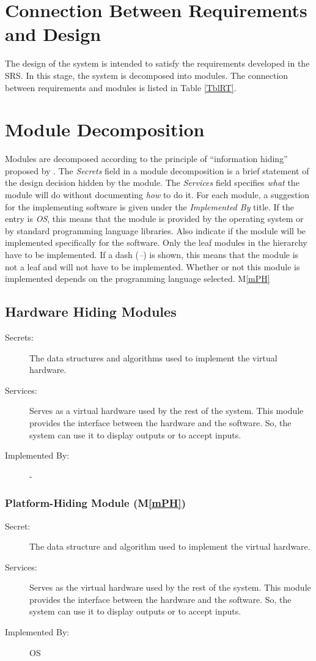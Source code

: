 \documentclass[12pt, titlepage]{article}
\newcommand{\mref}[1]{M\ref{#1}}
\begin{document}
	\section{Connection Between Requirements and Design} \label{SecConnection}
	The design of the system is intended to satisfy the requirements developed 
	in the SRS. In this stage, the system is decomposed into modules. The 
	connection between requirements and modules is listed in Table \ref{TblRT}.
	\section{Module Decomposition} \label{SecMD}
	Modules are decomposed according to the principle of ``information hiding''
	proposed by \citet{ParnasEtAl1984}. The \emph{Secrets} field in a module
	decomposition is a brief statement of the design decision hidden by the
	module. The \emph{Services} field specifies \emph{what} the module will do
	without documenting \emph{how} to do it. For each module, a suggestion for 
	the implementing software is given under the \emph{Implemented By} title. 
	If the entry is \emph{OS}, this means that the module is provided by the 
	operating system or by standard programming language libraries.  Also 
	indicate if the module will be implemented specifically for the software.
	Only the leaf modules in the hierarchy have to be implemented. If a dash 
	(\emph{--}) is shown, this means that the module is not a leaf and will not 
	have to be implemented. Whether or not this module is implemented depends 
	on the programming language selected.
	\mref{mPH}\subsection{Hardware Hiding Modules}
	\begin{description}
		\item[Secrets:]The data structures and algorithms used to implement the 
		virtual hardware.
		\item[Services:]Serves as a virtual hardware used by the rest of the 
		system. This module provides the interface between the hardware and the 
		software. So, the system can use it to display outputs or to accept 
		inputs.
		\item[Implemented By:] -
	\end{description}
	\subsubsection{Platform-Hiding Module (\mref{mPH})}
	\begin{description}
		\item[Secret:]The data structure and algorithm used to implement the 
		virtual hardware.
		\item[Services:]Serves as the virtual hardware used by the rest of the 
		system. This module provides the interface between the hardware and the 
		software. So, the system can use it to display outputs or to accept 
		inputs.
		\item[Implemented By:] OS
	\end{description}
	
\end{document}
